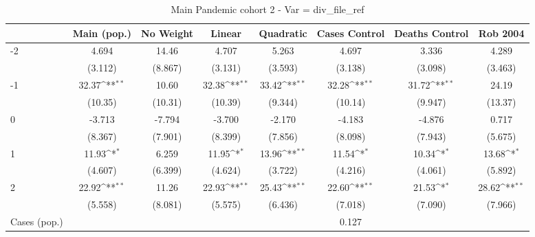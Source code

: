 \documentclass{article}
\begin{document}
{
\def\sym#1{\ifmmode^{#1}\else\(^{#1}\)\fi}
\begin{longtable}{l*{7}{c}}
\caption{Main Pandemic cohort 2 - Var = div\_file\_ref}\\
\hline\hline\endfirsthead\hline\endhead\hline\endfoot\endlastfoot
                &\multicolumn{1}{c}{Main (pop.)}&\multicolumn{1}{c}{No Weight}&\multicolumn{1}{c}{Linear}&\multicolumn{1}{c}{Quadratic}&\multicolumn{1}{c}{Cases Control}&\multicolumn{1}{c}{Deaths Control}&\multicolumn{1}{c}{Rob 2004}\\
\hline
-2              &    4.694         &    14.46         &    4.707         &    5.263         &    4.697         &    3.336         &    4.289         \\
                &  (3.112)         &  (8.867)         &  (3.131)         &  (3.593)         &  (3.138)         &  (3.098)         &  (3.463)         \\
-1              &    32.37\sym{**} &    10.60         &    32.38\sym{**} &    33.42\sym{**} &    32.28\sym{**} &    31.72\sym{**} &    24.19         \\
                &  (10.35)         &  (10.31)         &  (10.39)         &  (9.344)         &  (10.14)         &  (9.947)         &  (13.37)         \\
0               &   -3.713         &   -7.794         &   -3.700         &   -2.170         &   -4.183         &   -4.876         &    0.717         \\
                &  (8.367)         &  (7.901)         &  (8.399)         &  (7.856)         &  (8.098)         &  (7.943)         &  (5.675)         \\
1               &    11.93\sym{*}  &    6.259         &    11.95\sym{*}  &    13.96\sym{**} &    11.54\sym{*}  &    10.34\sym{*}  &    13.68\sym{*}  \\
                &  (4.607)         &  (6.399)         &  (4.624)         &  (3.722)         &  (4.216)         &  (4.061)         &  (5.892)         \\
2               &    22.92\sym{**} &    11.26         &    22.93\sym{**} &    25.43\sym{**} &    22.60\sym{**} &    21.53\sym{*}  &    28.62\sym{**} \\
                &  (5.558)         &  (8.081)         &  (5.575)         &  (6.436)         &  (7.018)         &  (7.090)         &  (7.966)         \\
Cases (pop.)    &                  &                  &                  &                  &    0.127         &                  &                  \\

\end{longtable}}
\end{document}
